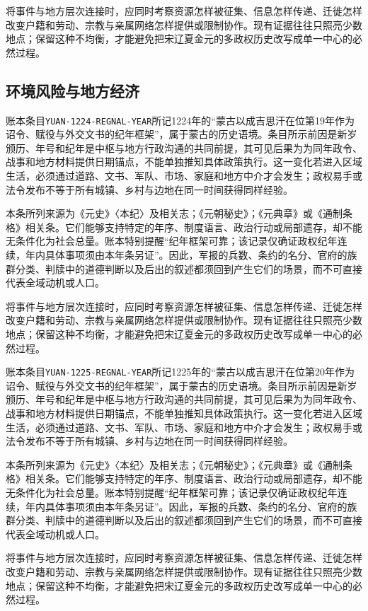 将事件与地方层次连接时，应同时考察资源怎样被征集、信息怎样传递、迁徙怎样改变户籍和劳动、宗教与亲属网络怎样提供或限制协作。现有证据往往只照亮少数地点；保留这种不均衡，才能避免把宋辽夏金元的多政权历史改写成单一中心的必然过程。

\subsection{环境风险与地方经济}

账本条目\texttt{YUAN-1224-REGNAL-YEAR}所记1224年的“蒙古以成吉思汗在位第19年作为诏令、赋役与外交文书的纪年框架”，属于蒙古的历史语境。条目所示前因是新岁颁历、年号和纪年是中枢与地方行政沟通的共同前提，其可见后果为为同年政令、战事和地方材料提供日期锚点，不能单独推知具体政策执行。这一变化若进入区域生活，必须通过道路、文书、军队、市场、家庭和地方中介才会发生；政权易手或法令发布不等于所有城镇、乡村与边地在同一时间获得同样经验。

本条所列来源为《元史》〈本纪〉及相关志；《元朝秘史》；《元典章》或《通制条格》相关条。它们能够支持特定的年序、制度语言、政治行动或局部遗存，却不能无条件化为社会总量。账本特别提醒“纪年框架可靠；该记录仅确证政权纪年连续，年内具体事项须由本年条另证”。因此，军报的兵数、条约的名分、官府的族群分类、判牍中的道德判断以及后出的叙述都须回到产生它们的场景，而不可直接代表全域动机或人口。

将事件与地方层次连接时，应同时考察资源怎样被征集、信息怎样传递、迁徙怎样改变户籍和劳动、宗教与亲属网络怎样提供或限制协作。现有证据往往只照亮少数地点；保留这种不均衡，才能避免把宋辽夏金元的多政权历史改写成单一中心的必然过程。

账本条目\texttt{YUAN-1225-REGNAL-YEAR}所记1225年的“蒙古以成吉思汗在位第20年作为诏令、赋役与外交文书的纪年框架”，属于蒙古的历史语境。条目所示前因是新岁颁历、年号和纪年是中枢与地方行政沟通的共同前提，其可见后果为为同年政令、战事和地方材料提供日期锚点，不能单独推知具体政策执行。这一变化若进入区域生活，必须通过道路、文书、军队、市场、家庭和地方中介才会发生；政权易手或法令发布不等于所有城镇、乡村与边地在同一时间获得同样经验。

本条所列来源为《元史》〈本纪〉及相关志；《元朝秘史》；《元典章》或《通制条格》相关条。它们能够支持特定的年序、制度语言、政治行动或局部遗存，却不能无条件化为社会总量。账本特别提醒“纪年框架可靠；该记录仅确证政权纪年连续，年内具体事项须由本年条另证”。因此，军报的兵数、条约的名分、官府的族群分类、判牍中的道德判断以及后出的叙述都须回到产生它们的场景，而不可直接代表全域动机或人口。

将事件与地方层次连接时，应同时考察资源怎样被征集、信息怎样传递、迁徙怎样改变户籍和劳动、宗教与亲属网络怎样提供或限制协作。现有证据往往只照亮少数地点；保留这种不均衡，才能避免把宋辽夏金元的多政权历史改写成单一中心的必然过程。

